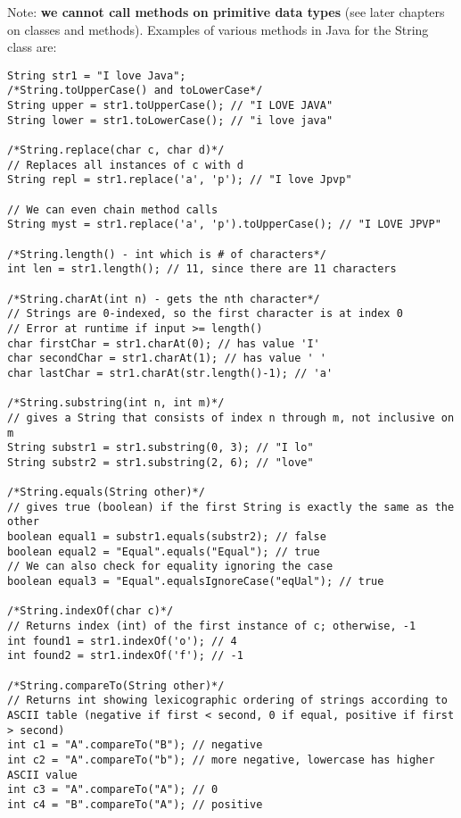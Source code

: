 \noindent Note: \textbf{we cannot call methods on primitive data types} (see later chapters on classes and methods). Examples of various methods in Java for the String class are:
\begin{lstlisting}
String str1 = "I love Java";
/*String.toUpperCase() and toLowerCase*/
String upper = str1.toUpperCase(); // "I LOVE JAVA"
String lower = str1.toLowerCase(); // "i love java"

/*String.replace(char c, char d)*/
// Replaces all instances of c with d
String repl = str1.replace('a', 'p'); // "I love Jpvp"

// We can even chain method calls
String myst = str1.replace('a', 'p').toUpperCase(); // "I LOVE JPVP"

/*String.length() - int which is # of characters*/
int len = str1.length(); // 11, since there are 11 characters

/*String.charAt(int n) - gets the nth character*/
// Strings are 0-indexed, so the first character is at index 0
// Error at runtime if input >= length()
char firstChar = str1.charAt(0); // has value 'I'
char secondChar = str1.charAt(1); // has value ' '
char lastChar = str1.charAt(str.length()-1); // 'a'

/*String.substring(int n, int m)*/
// gives a String that consists of index n through m, not inclusive on m
String substr1 = str1.substring(0, 3); // "I lo"
String substr2 = str1.substring(2, 6); // "love"

/*String.equals(String other)*/
// gives true (boolean) if the first String is exactly the same as the other
boolean equal1 = substr1.equals(substr2); // false
boolean equal2 = "Equal".equals("Equal"); // true
// We can also check for equality ignoring the case
boolean equal3 = "Equal".equalsIgnoreCase("eqUal"); // true

/*String.indexOf(char c)*/
// Returns index (int) of the first instance of c; otherwise, -1
int found1 = str1.indexOf('o'); // 4
int found2 = str1.indexOf('f'); // -1

/*String.compareTo(String other)*/
// Returns int showing lexicographic ordering of strings according to ASCII table (negative if first < second, 0 if equal, positive if first > second)
int c1 = "A".compareTo("B"); // negative
int c2 = "A".compareTo("b"); // more negative, lowercase has higher ASCII value
int c3 = "A".compareTo("A"); // 0
int c4 = "B".compareTo("A"); // positive
\end{lstlisting}

